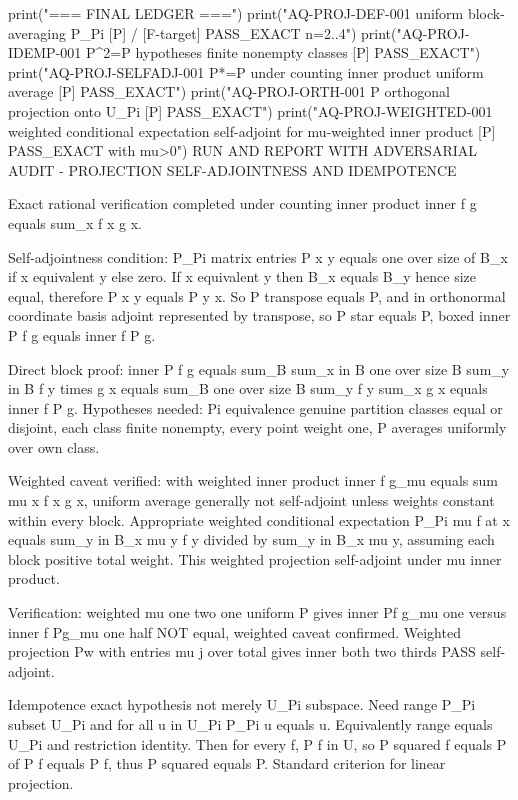print("\n=== FINAL LEDGER ===")
print("AQ-PROJ-DEF-001 uniform block-averaging P_Pi [P] / [F-target] PASS_EXACT n=2..4")
print("AQ-PROJ-IDEMP-001 P^2=P hypotheses finite nonempty classes [P] PASS_EXACT")
print("AQ-PROJ-SELFADJ-001 P*=P under counting inner product uniform average [P] PASS_EXACT")
print("AQ-PROJ-ORTH-001 P orthogonal projection onto U_Pi [P] PASS_EXACT")
print("AQ-PROJ-WEIGHTED-001 weighted conditional expectation self-adjoint for mu-weighted inner product [P] PASS_EXACT with mu>0")
RUN AND REPORT WITH ADVERSARIAL AUDIT - PROJECTION SELF-ADJOINTNESS AND IDEMPOTENCE

Exact rational verification completed under counting inner product inner f g equals sum_x f x g x.

Self-adjointness condition: P_Pi matrix entries P x y equals one over size of B_x if x equivalent y else zero. If x equivalent y then B_x equals B_y hence size equal, therefore P x y equals P y x. So P transpose equals P, and in orthonormal coordinate basis adjoint represented by transpose, so P star equals P, boxed inner P f g equals inner f P g.

Direct block proof: inner P f g equals sum_B sum_x in B one over size B sum_y in B f y times g x equals sum_B one over size B sum_y f y sum_x g x equals inner f P g. Hypotheses needed: Pi equivalence genuine partition classes equal or disjoint, each class finite nonempty, every point weight one, P averages uniformly over own class.

Weighted caveat verified: with weighted inner product inner f g_mu equals sum mu x f x g x, uniform average generally not self-adjoint unless weights constant within every block. Appropriate weighted conditional expectation P_Pi mu f at x equals sum_y in B_x mu y f y divided by sum_y in B_x mu y, assuming each block positive total weight. This weighted projection self-adjoint under mu inner product.

Verification: weighted mu one two one uniform P gives inner Pf g_mu one versus inner f Pg_mu one half NOT equal, weighted caveat confirmed. Weighted projection Pw with entries mu j over total gives inner both two thirds PASS self-adjoint.

Idempotence exact hypothesis not merely U_Pi subspace. Need range P_Pi subset U_Pi and for all u in U_Pi P_Pi u equals u. Equivalently range equals U_Pi and restriction identity. Then for every f, P f in U, so P squared f equals P of P f equals P f, thus P squared equals P. Standard criterion for linear projection.

